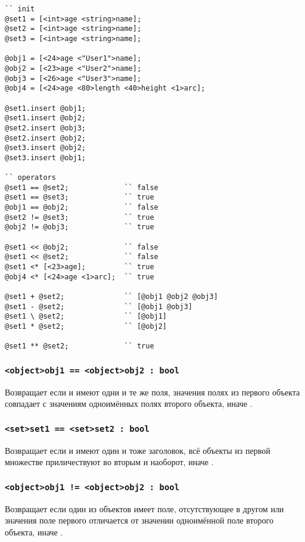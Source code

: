 \documentclass[a4paper, 14pt]{extarticle}
\begin{document}
\begin{lstlisting}[caption=Примеры использования операторов над данными типа object и set, label=setobjopex]
`` init
@set1 = [<int>age <string>name];
@set2 = [<int>age <string>name];
@set3 = [<int>age <string>name];

@obj1 = [<24>age <"User1">name];
@obj2 = [<23>age <"User2">name];
@obj3 = [<26>age <"User3">name];
@obj4 = [<24>age <80>length <40>height <1>arc];

@set1.insert @obj1;
@set1.insert @obj2;
@set2.insert @obj3;
@set2.insert @obj2;
@set3.insert @obj2;
@set3.insert @obj1;

`` operators
@set1 == @set2;				`` false
@set1 == @set3;				`` true
@obj1 == @obj2;				`` false
@set2 != @set3;				`` true
@obj2 != @obj3;				`` true

@set1 << @obj2;				`` false
@set1 << @set2;				`` false
@set1 <* [<23>age];			`` true
@obj4 <* [<24>age <1>arc];	`` true

@set1 + @set2;				`` [@obj1 @obj2 @obj3]
@set1 - @set2;				`` [@obj1 @obj3]
@set1 \ @set2;				`` [@obj1]
@set1 * @set2;				`` [@obj2]

@set1 ** @set2;				`` true
\end{lstlisting}

\subsubsection{\lstinline`<object>obj1 == <object>obj2 : bool`}

Возвращает \true{} если  и  имеют одни и те же поля, значения полях из первого объекта совпадает с значениям одноимённых полях второго объекта, иначе \false{}.

\subsubsection{\lstinline`<set>set1 == <set>set2 : bool`}

Возвращает \true{} если  и  имеют один и тоже заголовок, всё объекты из первой множестве приличествуют во вторым и наоборот, иначе \false{}.

\subsubsection{\lstinline`<object>obj1 != <object>obj2 : bool`}

Возвращает \true{} если один из объектов имеет поле, отсутствующее в другом или значения поле первого отличается от значении одноимённой поле второго объекта, иначе \false{}.
\end{document}
